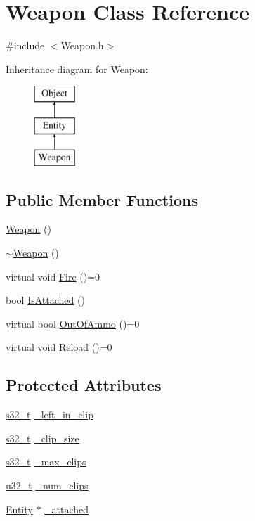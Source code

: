 \section{Weapon Class Reference}
\label{class_weapon}


{\ttfamily \#include $<$Weapon.\-h$>$}

Inheritance diagram for Weapon\-:\begin{figure}[H]
\begin{center}
\leavevmode
\includegraphics[height=3.000000cm]{class_weapon}
\end{center}
\end{figure}
\subsection*{Public Member Functions}
\begin{DoxyCompactItemize}
\item 
\hyperlink{class_weapon_a42dbc46dd70319a24763992c4ebbd396}{Weapon} ()
\item 
\hyperlink{class_weapon_a420e7ba3d2017e6de3e93eb579cfd3fa}{$\sim$\-Weapon} ()
\item 
virtual void \hyperlink{class_weapon_a8502c88be7164dca0a53b5d7aec871c9}{Fire} ()=0
\item 
bool \hyperlink{class_weapon_a40cbe14e106cd00cbc95654f150c0447}{Is\-Attached} ()
\item 
virtual bool \hyperlink{class_weapon_ad3be4b01c0d7e8ef3a62596da34941f8}{Out\-Of\-Ammo} ()=0
\item 
virtual void \hyperlink{class_weapon_aab14a64ba9e3e06437ef6f274a33d49a}{Reload} ()=0
\end{DoxyCompactItemize}
\subsection*{Protected Attributes}
\begin{DoxyCompactItemize}
\item 
\hyperlink{types_8h_aeeae8d6781b7e821dd3e743202314d66}{s32\-\_\-t} \hyperlink{class_weapon_a7b7c30447a03543f830c870bd1ec8a32}{\-\_\-left\-\_\-in\-\_\-clip}
\item 
\hyperlink{types_8h_aeeae8d6781b7e821dd3e743202314d66}{s32\-\_\-t} \hyperlink{class_weapon_a316034dd390b487c61e4dfca16617983}{\-\_\-clip\-\_\-size}
\item 
\hyperlink{types_8h_aeeae8d6781b7e821dd3e743202314d66}{s32\-\_\-t} \hyperlink{class_weapon_ad71351329aa1373da91c0f773dad887b}{\-\_\-max\-\_\-clips}
\item 
\hyperlink{types_8h_a0c0a490ab7fa397be6c764a935cc5ea4}{u32\-\_\-t} \hyperlink{class_weapon_af2cfb95c5dc297747475435c2201d592}{\-\_\-num\-\_\-clips}
\item 
\hyperlink{class_entity}{Entity} $\ast$ \hyperlink{class_weapon_ab248a10c00a363413349dc58860fa1fa}{\-\_\-attached}
\end{DoxyCompactItemize}
